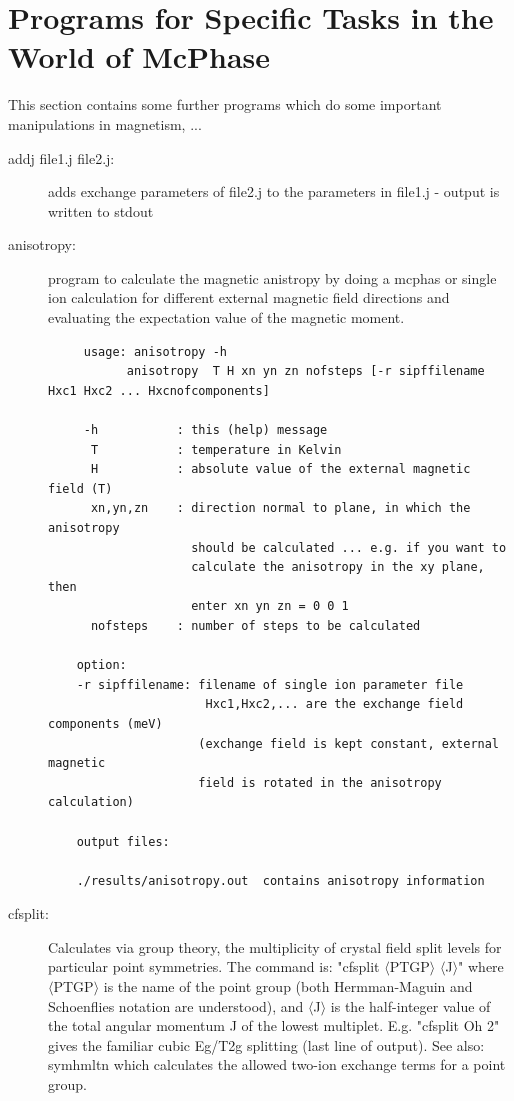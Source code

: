 \section{Programs for Specific Tasks in the World of McPhase}\label{addprog}

This section  contains some further programs which do some important manipulations
in magnetism, ...

\begin{description} 

\item [\prg addj file1.j file2.j:] adds exchange parameters of file2.j to the %
parameters in
file1.j - output is written to stdout


\item [\prg anisotropy:] program to calculate the magnetic anistropy
by doing a mcphas or
               single ion calculation for different external magnetic field
               directions and evaluating the expectation value of the magnetic 
               moment.
\begin{verbatim}
     usage: anisotropy -h
           anisotropy  T H xn yn zn nofsteps [-r sipffilename Hxc1 Hxc2 ... Hxcnofcomponents]

     -h           : this (help) message
      T           : temperature in Kelvin
      H           : absolute value of the external magnetic field (T)
      xn,yn,zn    : direction normal to plane, in which the anisotropy
                    should be calculated ... e.g. if you want to
                    calculate the anisotropy in the xy plane, then
                    enter xn yn zn = 0 0 1
      nofsteps    : number of steps to be calculated 

    option:
    -r sipffilename: filename of single ion parameter file
                      Hxc1,Hxc2,... are the exchange field components (meV)
                     (exchange field is kept constant, external magnetic
                     field is rotated in the anisotropy calculation)

    output files:

    ./results/anisotropy.out  contains anisotropy information

\end{verbatim}

\item [\prg cfsplit:] Calculates via group theory, the multiplicity of crystal field split levels 
for particular point symmetries. The command is: "{\prg cfsplit $\langle$PTGP$\rangle$ $\langle$J$\rangle$}"
where {\prg $\langle$PTGP$\rangle$} is the name of the point group (both Hermman-Maguin and 
Schoenflies notation are understood), and {\prg $\langle$J$\rangle$} is the half-integer value 
of the total angular momentum J of the lowest multiplet. E.g. "{\prg cfsplit Oh 2}" gives the 
familiar cubic Eg/T2g splitting (last line of output).
See also: {\prg symhmltn} which calculates the allowed two-ion exchange terms for a point group.


\end{description}
